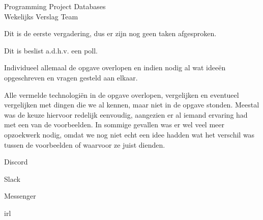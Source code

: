 \documentclass{article}
\newcounter{team}
\begin{document}
	
	\begin{Minutes}{Programming Project Databases \\ Wekelijks Verslag Team }
		\missingNoExcuse{/}
		
		\maketitle
		
		
		
			Dit is de eerste vergadering, dus er zijn nog geen taken afgesproken.
		
			

			
					Dit is beslist a.d.h.v. een poll.
					\begin{Vote}
					\end{Vote}
					Individueel allemaal de opgave overlopen en indien nodig al wat idee\"en opgeschreven en vragen gesteld aan elkaar.
				
					Alle vermelde technologi\"en in de opgave overlopen, vergelijken en eventueel vergelijken met dingen die we al kennen, maar niet in de opgave stonden. Meestal was de keuze hiervoor redelijk eenvoudig, aangezien er al iemand ervaring had met een van de voorbeelden. In sommige gevallen was er wel veel meer opzoekwerk nodig, omdat we nog niet echt een idee hadden wat het verschil was tussen de voorbeelden of waarvoor ze juist dienden.
					
			
				\begin{Opinions}
					\item Discord
					\item Slack
					\item Messenger
					\item irl
				\end{Opinions}
				

\end{Minutes}
\end{document}
